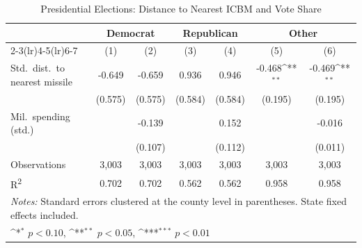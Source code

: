 \begin{table}[htbp]\centering
\setlength{\tabcolsep}{5pt}
\small
\def\sym#1{\ifmmode^{#1}\else\(^{#1}\)\fi}
\caption{Presidential Elections: Distance to Nearest ICBM and Vote Share}
\begin{tabular}{l*{6}{c}}
\toprule
                    &\multicolumn{2}{c}{Democrat}&\multicolumn{2}{c}{Republican}&\multicolumn{2}{c}{Other}\\
\cmidrule(lr){2-3}\cmidrule(lr){4-5}\cmidrule(lr){6-7}
                    &\multicolumn{1}{c}{(1)}&\multicolumn{1}{c}{(2)}&\multicolumn{1}{c}{(3)}&\multicolumn{1}{c}{(4)}&\multicolumn{1}{c}{(5)}&\multicolumn{1}{c}{(6)}\\
\midrule
Std.\ dist.\ to nearest missile
                    &      -0.649         &      -0.659         &       0.936         &       0.946         &      -0.468\sym{**} &      -0.469\sym{**} \\
                    &     (0.575)         &     (0.575)         &     (0.584)         &     (0.584)         &     (0.195)         &     (0.195)         \\
Mil.\ spending (std.)
                    &                     &      -0.139         &                     &       0.152         &                     &      -0.016         \\
                    &                     &     (0.107)         &                     &     (0.112)         &                     &     (0.011)         \\
\midrule
Observations        &       3,003         &       3,003         &       3,003         &       3,003         &       3,003         &       3,003         \\
R\textsuperscript{2}&       0.702         &       0.702         &       0.562         &       0.562         &       0.958         &       0.958         \\
\bottomrule
\multicolumn{7}{l}{\footnotesize \textit{Notes:} Standard errors clustered at the county level in parentheses. State fixed effects included.}\\
\multicolumn{7}{l}{\footnotesize \sym{*} \(p<0.10\), \sym{**} \(p<0.05\), \sym{***} \(p<0.01\)}\\
\end{tabular}
\end{table}
